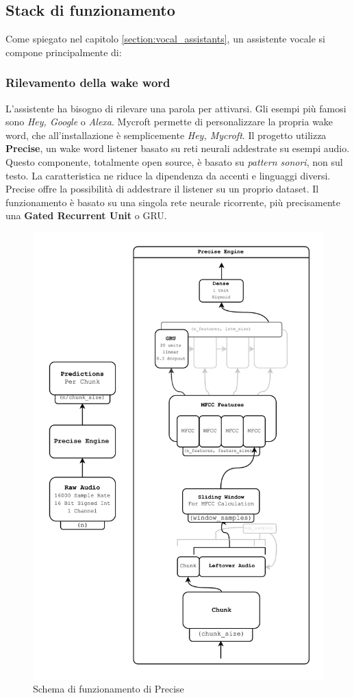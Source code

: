 \subsection{Stack di funzionamento}
Come spiegato nel capitolo \ref{section:vocal_assistants}, un assistente vocale si compone principalmente di:
\subsubsection{Rilevamento della wake word}
L'assistente ha bisogno di rilevare una parola per attivarsi. Gli esempi più famosi sono \textit{Hey, Google} o \textit{Alexa}. Mycroft permette di personalizzare la propria wake word, che all'installazione è semplicemente \textit{Hey, Mycroft}. Il progetto utilizza \textbf{Precise}, un wake word listener basato su reti neurali addestrate su esempi audio. Questo componente, totalmente open source, è basato su \textit{pattern sonori}, non sul testo. La caratteristica ne riduce la dipendenza da accenti e linguaggi diversi. Precise offre la possibilità di addestrare il listener su un proprio dataset. Il funzionamento è basato su una singola rete neurale ricorrente, più precisamente una \textbf{Gated Recurrent Unit} o GRU.
\begin{figure}[H]
    \begin{center}
        \includegraphics[width=0.6\columnwidth]{images/mycroft/precise.jpg}
    \end{center}
    \caption{Schema di funzionamento di Precise}
    \label{fig:precise}
\end{figure}
